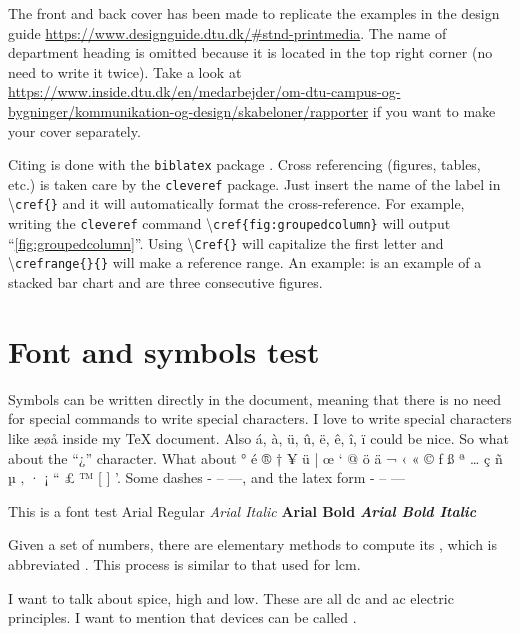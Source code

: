 The front and back cover has been made to replicate the examples in the design guide \url{https://www.designguide.dtu.dk/#stnd-printmedia}. The name of department heading is omitted because it is located in the top right corner (no need to write it twice). Take a look at \url{https://www.inside.dtu.dk/en/medarbejder/om-dtu-campus-og-bygninger/kommunikation-og-design/skabeloner/rapporter} if you want to make your cover separately. 

Citing is done with the \texttt{biblatex} package \cite{biblatex}. Cross referencing (figures, tables, etc.) is taken care by the \texttt{cleveref} package. Just insert the name of the label in \textbackslash \texttt{cref\{\}} and it will automatically format the cross-reference. For example, writing the \texttt{cleveref} command \textbackslash \texttt{cref\{fig:groupedcolumn\}} will output ``\cref{fig:groupedcolumn}''. Using \textbackslash \texttt{Cref\{\}} will capitalize the first letter and \textbackslash \texttt{crefrange\{\}\{\}} will make a reference range. An example:  is an example of a stacked bar chart and  are three consecutive figures.

\section{Font and symbols test}
Symbols can be written directly in the document, meaning that there is no need for special commands to write special characters. I love to write special characters like æøå inside my \TeX{} document. Also á, à, ü, û, ë, ê, î, ï could be nice. So what about the ``¿'' character. What about ° é ® † ¥ ü | œ ‘ @ ö ä ¬ ‹ « © ƒ ß ª … ç ñ µ ‚ · ¡ “ £ ™ [ ] '. Some dashes - – —, and the latex form - -- --- 

This is a font test \newline 
Arial Regular \newline 
\textit{Arial Italic} \newline 
\textbf{Arial Bold} \newline 
\textbf{\textit{Arial Bold Italic}}


Given a set of numbers, there are elementary methods to compute 
its , which is abbreviated . This 
process is similar to that used for \acrfull{lcm}.

I want to talk about \gls{spice}, \gls{high} and \gls{low}. These are all \gls{dc} and \gls{ac} electric principles. I want to mention that  devices can be called .

